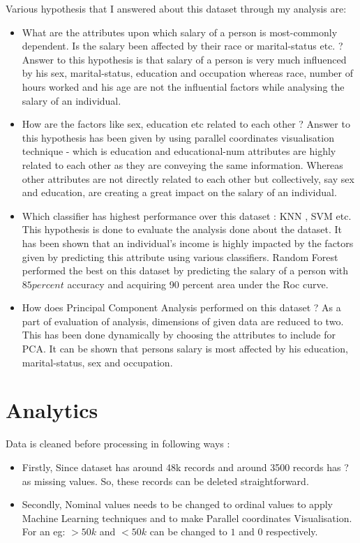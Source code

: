 \documentclass{article}
\begin{document}
\noindent Various hypothesis that I answered about this dataset through my analysis are:
\begin{itemize}
\item What are the attributes upon which salary of a person is most-commonly dependent. Is the salary been affected by their race or marital-status etc. ? 
\subsubitem Answer to this hypothesis is that salary of a person is very much influenced by his sex, marital-status, education and occupation whereas race, number of hours worked and his age are not the influential factors while analysing the salary of an individual.
\item How are the factors like sex, education etc related to each other ?
\subitem Answer to this hypothesis has been given by using parallel coordinates visualisation technique - which is education and educational-num attributes are highly related to each other as they are conveying the same information. Whereas other attributes are not directly related to each other but collectively, say sex and education, are creating a great impact on the salary of an individual.
\item Which classifier has highest performance over this dataset : KNN , SVM etc.
\subitem This hypothesis is done to evaluate the analysis done about the dataset. It has been shown that an individual's income is highly impacted by the factors given by predicting this attribute using various classifiers. Random Forest performed the best on this dataset by predicting the salary of a person with $85 percent$  accuracy and acquiring 90 percent area under the Roc curve.
\item How does Principal Component Analysis performed on this dataset ?
\subitem As a part of evaluation of analysis, dimensions of given data are reduced to two. This has been done dynamically by choosing the attributes to include for PCA. It can be shown that persons salary is most affected by his education, marital-status, sex and occupation.
\end{itemize}

\section*{Analytics}  

Data is cleaned before processing in following ways :
\begin{itemize}
\item Firstly, Since dataset has around 48k records and around 3500 records has ? as missing values. So, these records can be deleted straightforward. 
\item Secondly, Nominal values needs to be changed to ordinal values to apply Machine Learning techniques and to make Parallel coordinates Visualisation. For an eg: $>50k$ and $<50k$ can be changed to $1$ and $0$ respectively.
\end{itemize}
\end{document}
